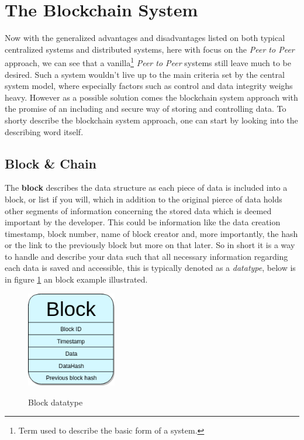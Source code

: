 \documentclass[paper=a4, fontsize=11pt]{scrartcl} %
\numberwithin{equation}{section} %
\numberwithin{figure}{section} %
\numberwithin{table}{section} %
\begin{document}
\section{The Blockchain System}

Now with the generalized advantages and disadvantages listed on both typical centralized systems and distributed systems, here with focus on the \textit{Peer to Peer} approach, we can see that a vanilla\footnote{Term used to describe the basic form of a system. } \textit{Peer to Peer} systems still leave much to be desired. Such a system wouldn't live up to the main criteria set by the central system model, where especially factors such as control and data integrity weighs heavy. However as a possible solution comes the blockchain system approach with the promise of an including and secure way of storing and controlling data. To shorty describe the blockchain system approach, one can start by looking into the describing word itself.

\subsection{Block \& Chain}

The \textbf{block} describes the data structure as each piece of data is included into a block, or list if you will, which in addition to the original pierce of data holds other segments of information concerning the stored data which is deemed important by the developer. This could be information like the data creation timestamp, block number, name of block creator and, more importantly, the hash or the link to the previously block but more on that later. So in short it is a way to handle and describe your data such that all necessary information regarding each data is saved and accessible\cite{block}, this is typically denoted as a \textit{datatype}, below is in figure \ref{fig:bd} an block example illustrated.  

\begin{figure}[H]
  \caption{Block datatype}
  \centering
    \includegraphics[width=0.35\textwidth]{block.png}
  \label{fig:bd}
\end{figure}
\end{document}
